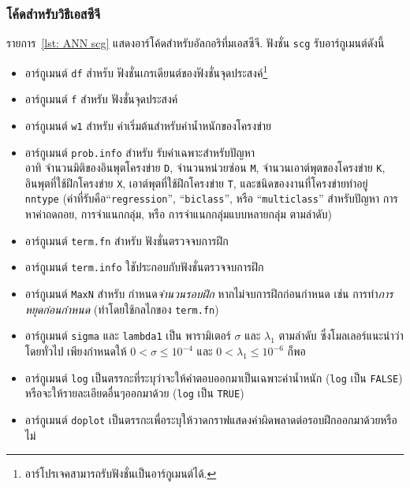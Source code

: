 \subsubsection{โค้ดสำหรับวิธีเอสซีจี}
รายการ~\ref{lst: ANN scg} แสดงอาร์โค้ดสำหรับอัลกอริทึ่มเอสซีจี.
ฟังชั่น \texttt{scg} รับอาร์กูเมนต์ดังนี้
\begin{itemize}
\item อาร์กูเมนต์ \texttt{df} สำหรับ ฟังชั่นเกรเดียนต์ของฟังชั่นจุดประสงค์\footnote{
อาร์โปรเจคสามารถรับฟังชั่นเป็นอาร์กูเมนต์ได้.}
\item อาร์กูเมนต์ \texttt{f} สำหรับ ฟังชั่นจุดประสงค์
\item อาร์กูเมนต์ \texttt{w1} สำหรับ ค่าเริ่มต้นสำหรับค่าน้ำหนักของโครงข่าย
\item อาร์กูเมนต์ \texttt{prob.info} สำหรับ รับค่าเฉพาะสำหรับปัญหา 
\\
อาทิ  จำนวนมิติของอินพุตโครงข่าย \texttt{D},
จำนวนหน่วยซ่อน \texttt{M},
จำนวนเอาต์พุตของโครงข่าย \texttt{K},
อินพุตที่ใช้ฝึกโครงข่าย \texttt{X},
เอาต์พุตที่ใช้ฝึกโครงข่าย \texttt{T},
และชนิดของงานที่โครงข่ายทำอยู่ \texttt{nntype} (ค่าที่รับคือ``\texttt{regression}'', ``\texttt{biclass}'', หรือ ``\texttt{multiclass}'' สำหรับปัญหา การหาค่าถดถอย, การจำแนกกลุ่ม, หรือ การจำแนกกลุ่มแบบหลายกลุ่ม ตามลำดับ)
\item อาร์กูเมนต์ \texttt{term.fn} สำหรับ ฟังชั่นตรวจจบการฝึก
\item อาร์กูเมนต์ \texttt{term.info} ใชัประกอบกับฟังชั่นตรวจจบการฝึก
\item อาร์กูเมนต์ \texttt{MaxN} สำหรับ กำหนด\textit{จำนวนรอบฝึก} หากไม่จบการฝึกก่อนกำหนด 
เช่น การทำ\textit{การหยุดก่อนกำหนด} (ทำโดยใช้กลไกของ \texttt{term.fn})
\item อาร์กูเมนต์ \texttt{sigma} และ \texttt{lambda1} เป็น พารามิเตอร์ $\sigma$ และ $\lambda_1$ ตามลำดับ
ซึ่งโมลเลอร์แนะนำว่า โดยทั่วไป เพียงกำหนดให้ $0 < \sigma \leq 10^{-4}$ และ $0 < \lambda_1 \leq 10^{-6}$ ก็พอ
\item อาร์กูเมนต์ \texttt{log} เป็นตรรกะที่ระบุว่าจะให้คำตอบออกมาเป็นเฉพาะค่าน้ำหนัก (\texttt{log} เป็น \texttt{FALSE}) หรือจะให้รายละเอียดอื่นๆออกมาด้วย (\texttt{log} เป็น \texttt{TRUE})
\item อาร์กูเมนต์ \texttt{doplot} เป็นตรรกะเพื่อระบุให้วาดกราฟแสดงค่าผิดพลาดต่อรอบฝึกออกมาด้วยหรือไม่
\end{itemize}




